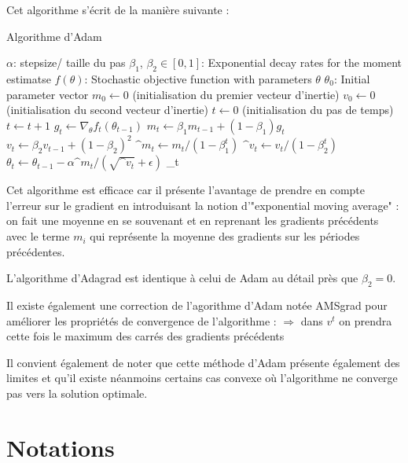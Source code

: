 \documentclass{article}
\begin{document}
Cet algorithme s'écrit de la manière suivante :

\bigskip

\begin{algorithm}
\caption{Algorithme d'Adam}
\begin{algorithmic}[1]
\REQUIRE $\alpha$: stepsize/ taille du pas
\REQUIRE $\beta_1$, $\beta_2 \in [0,1]$: Exponential decay rates for the moment estimatse
\REQUIRE $f(\theta)$: Stochastic objective function with parameters $\theta$
\REQUIRE $\theta_0$: Initial parameter vector
\State $m_0 \leftarrow 0$ (initialisation du premier vecteur d'inertie)
\State $v_0 \leftarrow 0$ (initialisation du second vecteur d'inertie)
\State $t \leftarrow 0$ (initialisation du pas de temps)
  \State $t \leftarrow t+1$
  \State $g_t \leftarrow \nabla _\theta f_t(\theta _{t-1})$
  \State $m_t \leftarrow \beta_1 m_{t-1} + (1-\beta_1) g_t$
  \State $v_t \leftarrow \beta_2 v_{t-1} + (1-\beta_2) ^2$
  \State $\^m_t \leftarrow m_{t}/(1- \beta_1^t)$
  \State $\^v_t \leftarrow v_{t}/(1- \beta_2^t)$
  \State $\theta_t \leftarrow \theta_{t-1} - \alpha \^m_t /(\sqrt{\^v_t}+\epsilon)$
\EndWhile
\RETURN \theta_t 
\end{algorithmic}
\end{algorithm}



\bigskip

Cet algorithme est efficace car il présente l'avantage de prendre en compte l'erreur sur le gradient en introduisant la notion d'"exponential moving average" : on fait une moyenne en se souvenant et en reprenant les gradients précédents avec le terme $m_i$ qui représente la moyenne des gradients sur les périodes précédentes.
\bigskip

L'algorithme d'Adagrad est identique à celui de Adam au détail près que $\beta_2=0$.

\bigskip

Il existe également une correction de l'agorithme d'Adam notée AMSgrad pour améliorer les propriétés de convergence de l'algorithme : $\Rightarrow$ dans $v^t$ on prendra cette fois le maximum des carrés des gradients précédents
\bigskip

\bigskip
Il convient également de noter que cette méthode d'Adam présente également des limites et qu'il existe néanmoins certains cas convexe où l'algorithme ne converge pas vers la solution optimale.

\bigskip

\section{Notations}
\end{document}
